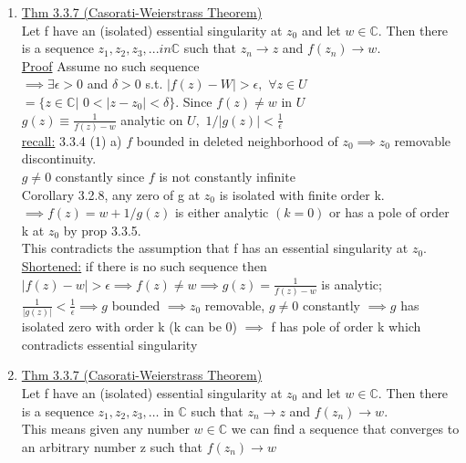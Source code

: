 \documentclass[12pt]{amsart}
\begin{document}
\begin{enumerate}
\item \underline{Thm 3.3.7 (Casorati-Weierstrass Theorem)}\\
Let f have an (isolated) essential singularity at $z_0$ and let $w \in \mathbb{C}$. Then there is a sequence $z_1, z_2, z_3,... in \mathbb{C}$ such that $z_n \rightarrow z$ and $f(z_n) \rightarrow w$.\\
\underline{Proof}
Assume no such sequence\\
$\implies \exists \epsilon >0$ and $\delta>0$ s.t. $|f(z)-W| > \epsilon,\,\, \forall z \in U$\\
$=\{z \in \mathbb{C} |\,\, 0 < |z-z_0| < \delta \}.$ Since $f(z) \neq w$ in $U$\\
$g(z) \equiv \frac{1}{f(z)-w}$ analytic on $U,\,\, 1/ |g(z)|< \frac{1}{\epsilon}$\\
\underline{recall:} 3.3.4 (1) a) $f$ bounded in deleted neighborhood of $z_0 \implies z_0$ removable discontinuity.\\
$g \neq 0$ constantly since $f$ is not constantly infinite\\
Corollary 3.2.8, any zero of g at $z_0$ is isolated with finite order k. $\implies f(z)=w+1/g(z)$ is either analytic $(k=0)$ or has a pole of order k at $z_0$ by prop 3.3.5.\\
This contradicts the assumption that f has an essential singularity at $z_0$.\\
\underline{Shortened:} if there is no such sequence then $|f(z)-w|>\epsilon \implies f(z) \neq w \implies g(z) =\frac{1}{f(z)-w}$ is analytic; $\frac{1}{|g(z)|} < \frac{1}{\epsilon} \implies g$ bounded $\implies z_0$ removable, $g \neq 0$ constantly $\implies g$ has isolated zero with order k (k can be 0) $\implies$ f has pole of order k which contradicts essential singularity





\hdashrule[0.5ex][c]{\linewidth}{0.5pt}{1.5mm}


\item \underline{Thm 3.3.7 (Casorati-Weierstrass Theorem)}\\
Let f have an (isolated) essential singularity at $z_0$ and let $w \in \mathbb{C}$. Then there is a sequence  $z_1,z_2,z_3, \dots $ in $ \mathbb{C}$ such that $z_n \rightarrow z$ and $ f(z_n) \rightarrow w$.\\
This means given any number $w \in \mathbb{C}$ we can find a sequence that converges to an arbitrary number z such that $f(z_n) \rightarrow w$


\end{enumerate}
\end{document}
